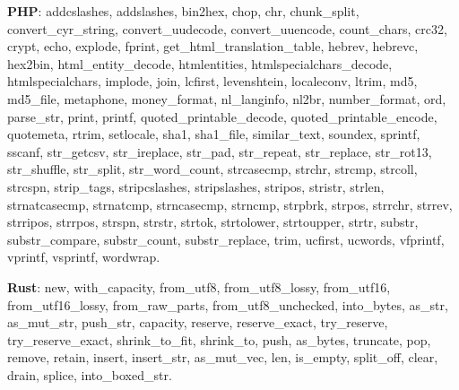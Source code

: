 \documentclass[anonymous,sigplan,review,11pt,nonacm,natbib=false]{acmart}
\begin{document}
    \textbf{PHP}: addcslashes, addslashes, bin2hex, chop, chr, chunk\_split, convert\_cyr\_string, convert\_uudecode, convert\_uuencode, count\_chars, crc32, crypt, echo, explode, fprint, get\_html\_translation\_table, hebrev, hebrevc, hex2bin, html\_entity\_decode, htmlentities, htmlspecialchars\_decode, htmlspecialchars, implode, join, lcfirst, levenshtein, localeconv, ltrim, md5, md5\_file, metaphone, money\_format, nl\_langinfo, nl2br, number\_format, ord, parse\_str, print, printf, quoted\_printable\_decode, quoted\_printable\_encode, quotemeta, rtrim, setlocale, sha1, sha1\_file, similar\_text, soundex, sprintf, sscanf, str\_getcsv, str\_ireplace, str\_pad, str\_repeat, str\_replace, str\_rot13, str\_shuffle, str\_split, str\_word\_count, strcasecmp, strchr, strcmp, strcoll, strcspn, strip\_tags, stripcslashes, stripslashes, stripos, stristr, strlen, strnatcasecmp, strnatcmp, strncasecmp, strncmp, strpbrk, strpos, strrchr, strrev, strripos, strrpos, strspn, strstr, strtok, strtolower, strtoupper, strtr, substr, substr\_compare, substr\_count, substr\_replace, trim, ucfirst, ucwords, vfprintf, vprintf, vsprintf, wordwrap.

    \textbf{Rust}: new, with\_capacity, from\_utf8, from\_utf8\_lossy, from\_utf16, from\_utf16\_lossy, from\_raw\_parts, from\_utf8\_unchecked, into\_bytes, as\_str, as\_mut\_str, push\_str, capacity, reserve, reserve\_exact, try\_reserve, try\_reserve\_exact, shrink\_to\_fit, shrink\_to, push, as\_bytes, truncate, pop, remove, retain, insert, insert\_str, as\_mut\_vec, len, is\_empty, split\_off, clear, drain, splice, into\_boxed\_str.
\end{document}
